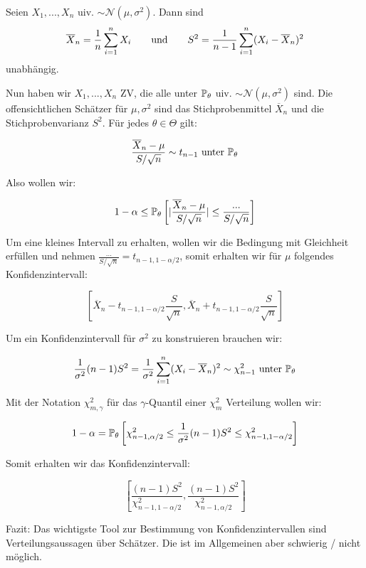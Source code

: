 
\begin{subbox}{} Seien $X_1,...,X_n$ uiv. $\sim \mathcal{N}(\mu, \sigma^2)$. Dann sind
$$\overline{X}_n = \frac{1}{n} \sum\limits_{i=1}^n X_i \qquad \text{und} \qquad S^2 = \frac{1}{n-1} \sum\limits_{i = 1}^n (X_i - \overline{X}_n)^2$$
unabhängig. \end{subbox}

Nun haben wir $X_1,...,X_n$ ZV, die alle unter $\mathbb{P}_\theta$ uiv. $\sim \mathcal{N}(\mu, \sigma^2)$ sind. Die offensichtlichen Schätzer für $\mu, \sigma^2$ sind das Stichprobenmittel $\overline{X}_n$ und die Stichprobenvarianz $S^2$. Für jedes $\theta \in \Theta$ gilt:

$$\frac{\overline{X}_n - \mu}{S / \sqrt{n}} \sim t_{n-1} \text{ unter } \mathbb{P}_\theta$$

Also wollen wir:

$$1- \alpha \leq \mathbb{P}_\theta \left[ | \frac{\overline{X}_n - \mu}{S / \sqrt{n}} | \leq \frac{...}{ S / \sqrt{n}} \right]$$

Um eine kleines Intervall zu erhalten, wollen wir die Bedingung mit Gleichheit erfüllen und nehmen $\frac{...}{ S / \sqrt{n}} = t_{n-1, 1 - \alpha / 2}$, somit erhalten wir für $\mu$ folgendes Konfidenzintervall:

$$\left[ \overline{X}_n - t_{n-1, 1 - \alpha / 2} \frac{S}{\sqrt{n}},  \overline{X}_n + t_{n-1, 1 - \alpha / 2} \frac{S}{\sqrt{n}} \right]$$

Um ein Konfidenzintervall für $\sigma^2$ zu konstruieren brauchen wir:

$$\frac{1}{\sigma^2} (n-1) S^2 = \frac{1}{\sigma^2} \sum\limits_{i=1}^n (X_i - \overline{X}_n)^2 \sim \chi_{n-1}^2 \text{ unter } \mathbb{P}_\theta$$

Mit der Notation $\chi_{m, \gamma}^2$ für das $\gamma$-Quantil einer $\chi_m^2$ Verteilung wollen wir:

$$1 - \alpha = \mathbb{P}_\theta \left[ \chi_{n-1, \alpha/2}^2 \leq \frac{1}{\sigma^2} (n-1) S^2 \leq \chi_{n-1, 1- \alpha/2}^2\right]$$

Somit erhalten wir das Konfidenzintervall:

$$\left[ \frac{(n-1) S^2}{\chi_{n-1, 1-\alpha/2}^2} , \frac{(n-1) S^2}{\chi_{n-1, \alpha/2}^2} \right]$$

Fazit: Das wichtigste Tool zur Bestimmung von Konfidenzintervallen sind Verteilungsaussagen über Schätzer. Die ist im Allgemeinen aber schwierig / nicht möglich.



